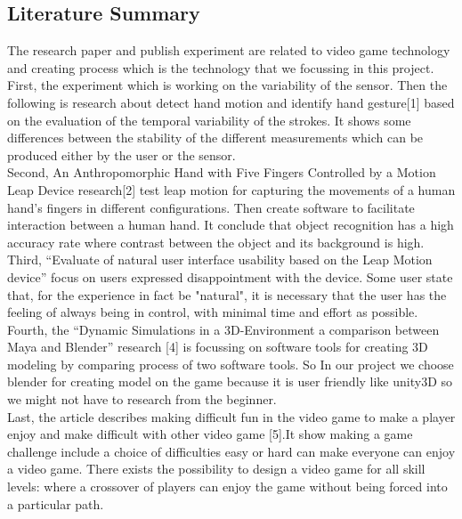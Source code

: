 \documentclass[12pt, oneside]{article}										%
\begin{document}
\begin{multicols*}{2}
        
    \section{Literature Summary}                                            %

    The research paper and publish experiment are related to video game 
    technology and creating process which is the technology that we 
    focussing in this project. \\

    First, the experiment which is working 
    on the variability of the sensor. Then the following is research 
    about detect hand motion and identify hand gesture[1] based on 
    the evaluation of the temporal variability of the strokes. It 
    shows some differences between the stability of the different 
    measurements which can be produced either by the user or the 
    sensor. \\

    Second, An Anthropomorphic Hand with Five Fingers 
    Controlled by a Motion Leap Device research[2] test leap motion 
    for capturing the movements of a human hand's fingers in different 
    configurations. Then create software to facilitate interaction 
    between a human hand. It conclude that object recognition has 
    a high accuracy rate where contrast between the object and its 
    background is high. \\
    
    Third, “Evaluate of natural user interface 
    usability based on the Leap Motion device” focus on users expressed 
    disappointment with the device. Some user state that, for the 
    experience in fact be "natural", it is necessary that the user has 
    the feeling of always being in control, with minimal time and 
    effort as possible. \\
    
    Fourth, the “Dynamic Simulations in a 3D-Environment 
    a comparison between Maya and Blender” research [4] is focussing on 
    software tools for creating 3D modeling by comparing process of two 
    software tools. So In our project we choose blender for creating model 
    on the game because it is user friendly like unity3D so we might not have 
    to research from the beginner. \\
    
    Last, the article describes making 
    difficult fun in the video game to make a player enjoy and make difficult 
    with other video game [5].It show making a game challenge include a choice 
    of difficulties easy or hard can make everyone can enjoy a video game. 
    There exists the possibility to design a video game for all skill 
    levels: where a crossover of players can enjoy the game without 
    being forced into a particular path.


\end{multicols*}
\end{document}
